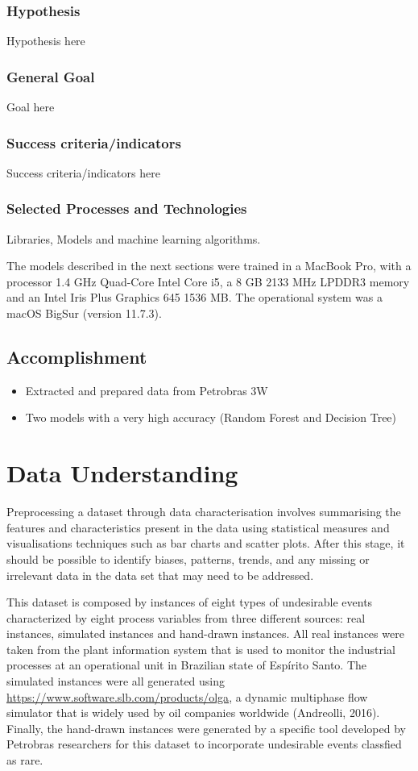 \documentclass{article}
\begin{document}
\subsubsection{Hypothesis}
Hypothesis here

\subsubsection{General Goal}
Goal here

\subsubsection{Success criteria/indicators}
Success criteria/indicators here

\subsubsection{Selected Processes and Technologies}
Libraries, Models and machine learning algorithms. 

The models described in the next sections were trained in a MacBook Pro, with a processor 1.4 GHz Quad-Core Intel Core i5, a 8 GB 2133 MHz LPDDR3 memory and an Intel Iris Plus Graphics 645 1536 MB. The operational system was a macOS BigSur (version 11.7.3).

\subsection{Accomplishment}
\begin{itemize}
\item Extracted and prepared data from Petrobras 3W
\item Two models with a very high accuracy (Random Forest and Decision Tree)
\end{itemize}

\section{Data Understanding}

Preprocessing a dataset through data characterisation involves summarising the features and characteristics present in the data using statistical measures and visualisations techniques such as bar charts and scatter plots. After this stage, it should be possible to identify biases, patterns, trends, and any missing or irrelevant data in the data set that may need to be addressed.

This dataset is composed by instances of eight types of undesirable events characterized by eight process variables from three different sources: real instances, simulated instances and hand-drawn instances. All real instances were taken from the plant information system that is used to monitor the industrial processes at an operational unit in Brazilian state of Espírito Santo. The simulated instances were all generated using \href{OLGA}{https://www.software.slb.com/products/olga}, a dynamic multiphase flow simulator that is widely used by oil companies worldwide (Andreolli, 2016). Finally, the hand-drawn instances were generated by a specific tool developed by Petrobras researchers for this dataset to incorporate undesirable events classfied as rare.
\end{document}

